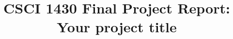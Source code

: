  
 \documentclass[10pt,twocolumn,letterpaper]{article}
 
\usepackage{cvpr}
\usepackage{times}
\usepackage{epsfig}
\usepackage{graphicx}
\usepackage{amsmath}
\usepackage{amssymb}
\usepackage{booktabs}
\usepackage{microtype}
\usepackage[numbered,framed]{matlab-prettifier}

\frenchspacing


\usepackage[pagebackref=true,breaklinks=true,letterpaper=true,colorlinks,bookmarks=false]{hyperref}

\cvprfinalcopy
\def\cvprPaperID{****}
\def\httilde{\mbox{\tt\raisebox{-.5ex}{\symbol{126}}}}
\ifcvprfinal\pagestyle{empty}\fi



\title{CSCI 1430 Final Project Report:\\Your project title}

